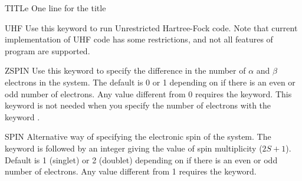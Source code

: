 \begin{keywordlist}
\item[TITLe]
One line for the title
\item[UHF]
Use this keyword to run Unrestricted Hartree-Fock code.
Note that current implementation of UHF code has some
restrictions, and not all features of  program are supported.
\item[ZSPIN]
Use this keyword to specify the difference in the number of $\alpha$ and $\beta$
electrons in the system. The default is 0 or 1 depending on if there is an even
or odd number of electrons.
Any value different from 0 requires the  keyword.
This keyword is not needed when you specify the number of electrons with
the keyword .
\item[SPIN]
Alternative way of specifying the electronic spin of the system.
The keyword is followed by an integer giving the value of spin multiplicity ($2S+1$).
Default is 1 (singlet) or 2 (doublet) depending on if there is an even or odd number of electrons.
Any value different from 1 requires the  keyword.

\end{keywordlist}
